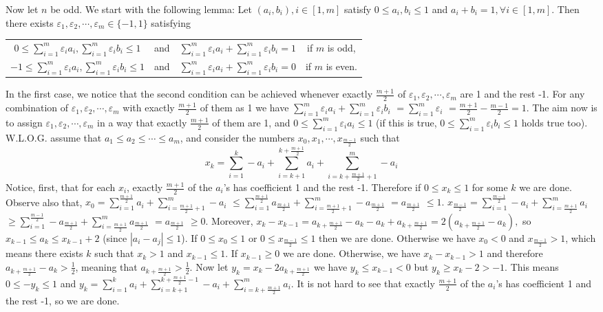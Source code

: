 \documentclass[11pt,a4paper]{article}
\begin{document}
\begin{itemize}
Now let $n$ be odd. 
We start with the following lemma: 
Let $(a_i, b_i), i\in [1,m]$ satisfy $0\le a_i, b_i\le 1$ and $a_i+b_i=1, \forall i\in [1,m]$. 
Then there exists $\varepsilon_1, \varepsilon_2, \cdots, \varepsilon_m\in \{-1, 1\}$ satisfying
\begin{center}
\begin{tabular}{c c c c} 
$0\le \sum_{i=1}^m \varepsilon_i a_i, \sum_{i=1}^m \varepsilon_i b_i\le 1$
& and & $\sum_{i=1}^m \varepsilon_i a_i +\sum_{i=1}^m \varepsilon_i b_i=1$ & if  $m$ is odd, \\ 
$-1\le \sum_{i=1}^m \varepsilon_i a_i, \sum_{i=1}^m \varepsilon_i b_i\le 1$
& and & $\sum_{i=1}^m \varepsilon_i a_i +\sum_{i=1}^m \varepsilon_i b_i=0$ & if  $m$ is even. \\ 
\end{tabular} 
\end{center}
In the first case, we notice that the second condition can be achieved whenever exactly $\frac{m+1}2$ of $\varepsilon_1, \varepsilon_2, \cdots , \varepsilon_m$ are 1 and the rest -1. 
For any combination of $\varepsilon_1, \varepsilon_2, \cdots , \varepsilon_m$ with exactly $\frac{m+1}{2}$ of them as 1 we have 
$ \sum_{i=1}^m \varepsilon_i a_i  + \sum_{i=1}^m \varepsilon_i b_i $
$=\sum_{i=1}^m \varepsilon_i$
$=\frac{m+1}{2}-\frac{m-1}{2}=1$. 
The aim now is to assign $\varepsilon_1, \varepsilon_2, \cdots , \varepsilon_m$ 
in a way that exactly $\frac{m+1}2$ of them are 1, and $0\le \sum_{i=1}^m \varepsilon_i a_i\le 1$ 
(if this is true, $0\le \sum_{i=1}^m \varepsilon_i b_i\le 1$ holds true too). 
W.L.O.G. assume that $a_1\le a_2\le\cdots \le a_m$, and consider the numbers 
$x_0, x_1, \cdots , x_{\frac{m-1}2}$ such that 
\[ x_k=\sum_{i=1}^{k} -a_i+\sum_{i=k+1}^{k+\frac{m+1}{2}} a_i+\sum_{i=k+\frac{m+1}{2}+1}^{m} -a_i\]
Notice, first, that for each $x_i$, exactly $\frac{m+1}{2}$ of the $a_i$'s has coefficient 1 and the rest -1. 
Therefore if $0\le x_k\le 1$ for some $k$ we are done. 
Observe also that, $x_0=\sum_{i=1}^{\frac{m+1}{2}} a_i+\sum_{i=\frac{m+1}{2}+1}^{m} -a_i$
$\le \sum_{i=1}^{\frac{m+1}{2}} a_{\frac{m+1}{2}} +\sum_{i=\frac{m+1}{2}+1}^{m} -a_{\frac{m+1}{2}}$
$=a_{\frac{m+1}{2}}$
$\le 1.$
$x_{\frac{m-1}{2}}=\sum_{i=1}^{\frac{m-1}{2}} -a_i+\sum_{i=\frac{m+1}{2}}^{m} a_i$
$\ge \sum_{i=1}^{\frac{m-1}{2}} -a_{\frac{m+1}{2}}+\sum_{i=\frac{m+1}{2}}^{m} a_{\frac{m+1}{2}}$
$=a_{\frac{m+1}{2}}$
$\ge 0$. 
Moreover, $x_k-x_{k-1}=a_{k+\frac{m+1}{2}}-a_{k}-a_{k}+a_{k+\frac{m+1}{2}}=2(a_{k+\frac{m+1}{2}}-a_{k}), $
so $x_{k-1}\le a_k\le x_{k-1}+2$ (since $|a_i-a_j|\le 1$). 
If $0\le x_0\le 1$ or $0\le x_{\frac{m-1}{2}}\le 1$ then we are done. 
Otherwise we have $x_0<0$ and $x_{\frac{m-1}{2}}>1$, 
which means there exists $k$ such that $x_k>1$ and $x_{k-1}\le 1$. 
If $x_{k-1}\ge 0$ we are done. 
Otherwise, we have $x_k-x_{k-1}>1$ and therefore $a_{k+\frac{m+1}{2}}-a_{k}>\frac 12$, 
meaning that $a_{k+\frac{m+1}{2}}>\frac 12$. 
Now let $y_k=x_k-2a_{k+\frac{m+1}{2}}$ we have $y_k\le x_{k-1}<0$ but $y_k\ge x_k-2>-1$. 
This means $0\le -y_k\le 1$ and 
$y_k=\sum_{i=1}^{k} a_i+\sum_{i=k+1}^{k+\frac{m+1}{2}-1} -a_i+\sum_{i=k+\frac{m+1}{2}}^{m} a_i$. 
It is not hard to see that exactly $\frac{m+1}{2}$ of the $a_i$'s has coefficient 1 and the rest -1, so we are done. 


\end{itemize}
\end{document}
